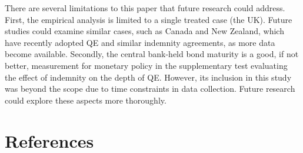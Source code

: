 \documentclass[
  a4paper,
  abstract=true]{scrartcl}
\theoremstyle{definition}
\begin{document}
There are several limitations to this paper that future research could
address. First, the empirical analysis is limited to a single treated
case (the UK). Future studies could examine similar cases, such as
Canada and New Zealand, which have recently adopted QE and similar
indemnity agreements, as more data become available. Secondly, the
central bank-held bond maturity is a good, if not better, measurement
for monetary policy in the supplementary test evaluating the effect of
indemnity on the depth of QE. However, its inclusion in this study was
beyond the scope due to time constraints in data collection. Future
research could explore these aspects more thoroughly.

\begin{comment}
\end{comment}

\newpage

\section*{References}\label{references}
\end{document}
